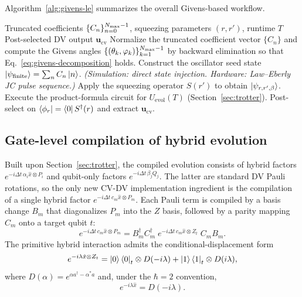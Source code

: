 \documentclass{article}
\begin{document}
Algorithm~\ref{alg:givens-le} summarizes the overall Givens-based workflow.
\begin{algorithm}[htbp]
\caption{Givens-based oscillator-state preparation and hybrid LCHS evolution}
\label{alg:givens-le}
\begin{algorithmic}[1]
\Require Truncated coefficients $\{C_n\}_{n=0}^{N_{\rm max}-1}$, squeezing parameters $(r,r')$, runtime $T$
\Ensure Post-selected DV output $\bm{u}_{\mathrm{cv}}$
\State Normalize the truncated coefficient vector $\{C_n\}$ and compute the Givens angles $\{(\theta_k,\varphi_k)\}_{k=1}^{N_{\rm max}-1}$ by backward elimination so that Eq.~\eqref{eq:givens-decomposition} holds.
\State Construct the oscillator seed state $\ket{\psi_{\mathrm{finite}}}=\sum_{n}C_n\ket{n}$.
\Statex \hspace{\algorithmicindent}\textit{(Simulation: direct state injection.  Hardware: Law--Eberly JC pulse sequence.)}
\State Apply the squeezing operator $S(r')$ to obtain $\ket{\psi_{r,r',\beta}}$.
\State Execute the product-formula circuit for $U_{\mathrm{evol}}(T)$ (Section~\ref{sec:trotter}).
\State Post-select on $\bra{\phi_r}=\bra{0}S^\dagger(r)$ and extract $\bm{u}_{\mathrm{cv}}$.
\end{algorithmic}
\end{algorithm}

\subsection{Gate-level compilation of hybrid evolution}
\label{sec:impl-trotter}
Built upon Section~\ref{sec:trotter}, the compiled evolution consists of hybrid factors $e^{-i\Delta t\,\alpha_i\hat{x}\otimes P_i}$ and qubit-only factors $e^{-i\Delta t\,\beta_j Q_j}$. The latter are standard DV Pauli rotations, so the only new CV-DV implementation ingredient is the compilation of a single hybrid factor $e^{-i\Delta t\,c_m\hat{x}\otimes P_m}$. Each Pauli term is compiled by a basis change $B_m$ that diagonalizes $P_m$ into the $Z$ basis,
followed by a parity mapping $C_m$ onto a target qubit $t$:
\begin{equation}
e^{-i\Delta t\,c_m\hat{x}\otimes P_m}
=
B_m^\dagger C_m^\dagger\;
e^{-i\Delta t\,c_m\hat{x}\otimes Z_t}\;
C_m B_m.
\label{eq:impl-parity}
\end{equation}
The primitive hybrid interaction admits the conditional-displacement form
\begin{equation}
e^{-i\lambda \hat{x}\otimes Z_t}
=
\ket{0}\bra{0}_t \otimes D(-i\lambda)
+
\ket{1}\bra{1}_t \otimes D(i\lambda),
\end{equation}
where $D(\alpha)=e^{\alpha a^\dagger-\alpha^* a}$ and, under the $\hbar=2$ convention,
\[
e^{-i\lambda \hat x}=D(-i\lambda).
\]
\end{document}
